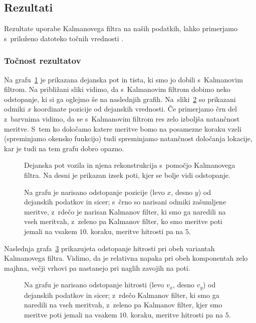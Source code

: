 \documentclass[a4paper,pdftex,10pt]{article}
\numberwithin{figure}{section} %
\begin{document}
\subsection{Rezultati}
Rezultate uporabe Kalmanovega filtra na naših podatkih, lahko primerjamo s~priloženo
datoteko točnih vrednosti .
\subsubsection{Točnost rezultatov}
Na grafu~\ref{slika1} je prikazana dejanska pot in tista, ki smo jo dobili s~Kalmanovim 
filtrom. Na približani sliki vidimo, da s~Kalmanovim filtrom dobimo neko odstopanje, ki 
si ga oglejmo še na naslednjih grafih. Na~sliki~\ref{slika2} so prikazani odmiki $x$ 
koordinate pozicije od dejanskih vrednosti. Če primerjamo črn del z~barvnima vidimo, da se 
s~Kalmanovim filtrom res zelo izboljša natančnost meritve. S~tem ko določamo katere meritve 
bomo na posamezne koraku vzeli (spreminjamo okensko funkcijo) tudi spreminjamo natančnost 
določanja lokacije, kar je tudi na tem grafu dobro opazno. \\
\begin{figure}[H] 
    \centering
    \resizebox{.49\linewidth}{!}{}
    \resizebox{.49\linewidth}{!}{}
    \caption{Dejanska pot vozila in njena rekonstrukcija s~pomočjo Kalmanovega filtra. Na desni je prikazan izsek poti, kjer se bolje vidi odstopanje.}
    \label{slika1}
\end{figure}
\begin{figure}[H]
    \centering
    \resizebox{.49\linewidth}{!}{}
    \resizebox{.49\linewidth}{!}{}
    \caption{Na grafu je narisano odstopanje pozicije (levo $x$, desno $y$) od dejanskih 
    podatkov in sicer; s~črno so narisani odmiki zašumljene meritve, z~rdečo je narisan 
    Kalmanov filter, ki smo ga naredili na vseh meritvah, z~zeleno pa Kalmanov filter, ko 
    smo meritve poti jemali na vsakem $10.$ koraku, meritve hitrosti pa na $5.$}
    \label{slika2}
\end{figure}
Naslednja grafa~\ref{slika2b} prikazujeta odstopanje hitrosti pri obeh variantah 
Kalmanovega filtra. Vidimo, da je relativna napaka pri obeh komponentah zelo majhna, večji
vrhovi pa nastanejo pri naglih zavojih na poti.
\begin{figure}[H]
    \centering
    \resizebox{.49\linewidth}{!}{}
    \resizebox{.49\linewidth}{!}{}
    \caption{Na grafu je narisano odstopanje hitrosti (levo $v_x$, desno $v_y$) od 
    dejanskih podatkov in sicer; z~rdečo Kalmanov filter, ki smo ga naredili na vseh 
    meritvah, z~zeleno pa Kalmanov filter, kjer smo meritve poti jemali na vsakem $10.$ 
    koraku, meritve hitrosti pa na $5.$}
    \label{slika2b}
\end{figure}
\end{document}
